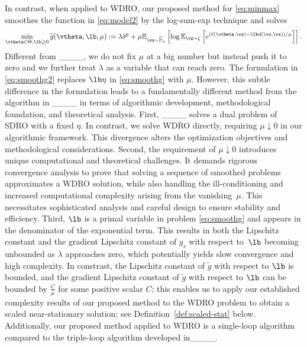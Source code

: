 		In contrast, when applied to WDRO, our proposed method for \eqref{eq:minmax} smoothes the function in \eqref{eq:model2} by the log-sum-exp technique and solves 
		\begin{equation}
			\label{eq:smoothg2}
			\min_{\vtheta \in \Theta, \lb \geq 0} \widetilde{g}(\vtheta, \lb, \mu) := \lambda \delta^p + \mu \mathbb{E}_{\vx \sim \widehat{\mathbb{P}}_n}\left[\log \mathbb{E}_{\vz \sim \zeta}\left[e^{(\ell(\vtheta, \vz) -\lb d(\vx, \vz)) / \mu}\right]\right].
		\end{equation}
		Different from ____, we do not fix $\mu$ at a big number but instead push it to zero and we further treat $\lambda$ as a variable that can reach zero. The formulation in \eqref{eq:smoothg2} 
		replaces \(\lb \eta\) in \eqref{eq:smoothg} with \(\mu\).  However, this subtle difference in the formulation leads to a fundamentally different method  
		from the algorithm in ____ in terms of algorithmic development, methodological foundation, and theoretical analysis.
		First, ____  
		solves a dual problem of SDRO with a  fixed  \(\eta\). In contrast, we  
		solve WDRO directly, requiring \(\mu \downarrow 0\) in our algorithmic framework. 
		This divergence alters the optimization objectives and methodological considerations.
		Second, the requirement of \(\mu \downarrow 0\)
		introduces unique computational and theoretical challenges. It demands rigorous convergence analysis  %
		to prove that solving a sequence of smoothed problems approximates a WDRO solution, while also handling the ill-conditioning and increased computational complexity arising from the vanishing~$\mu$. This necessitates sophisticated  
		analysis and careful design to ensure stability and efficiency.
		Third, \(\lb\) is a primal variable in problem \eqref{eq:smoothg} and appears in the denominator of the exponential term. 
		This results in both the Lipschitz constant and the gradient Lipschitz constant of 
		$g_s$  with respect to~$\lb$ becoming unbounded as 
		$\lambda$ approaches zero, which potentially yields slow convergence and high complexity. %
		In constrast, the Lipschitz constant of $\widetilde{g}$  with respect to \(\lb\) is bounded, and the gradient Lipschitz constant of $\widetilde{g}$   with respect to \(\lb\) can be bounded  by $\frac{C}{\mu}$ for some positive scalar $C$; %
		this enables us to apply our established complexity results of our proposed method to the WDRO problem to obtain a scaled near-stationary solution; see Definition~\ref{def:scaled-stat} below.
		Additionally, 
		our proposed method applied to WDRO is  
		a single-loop algorithm compared to the triple-loop algorithm developed in____.
		
